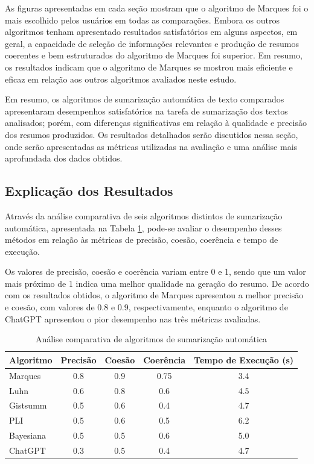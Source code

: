 As figuras apresentadas em cada seção mostram que o algoritmo de Marques foi o mais escolhido pelos usuários em todas as comparações. Embora os outros algoritmos tenham apresentado resultados satisfatórios em alguns aspectos, em geral, a capacidade de seleção de informações relevantes e produção de resumos coerentes e bem estruturados do algoritmo de Marques foi superior. Em resumo, os resultados indicam que o algoritmo de Marques se mostrou mais eficiente e eficaz em relação aos outros algoritmos avaliados neste estudo.

Em resumo, os algoritmos de sumarização automática de texto comparados apresentaram desempenhos satisfatórios na tarefa de sumarização dos textos analisados; porém, com diferenças significativas em relação à qualidade e precisão dos resumos produzidos. Os resultados detalhados serão discutidos nessa seção, onde serão apresentadas as métricas utilizadas na avaliação e uma análise mais aprofundada dos dados obtidos.

\subsection{Explicação dos Resultados}
\label{chap:explicacao}
Através da análise comparativa de seis algoritmos distintos de sumarização automática, apresentada 
na Tabela \ref{tab:algoritmos}, pode-se avaliar o desempenho desses métodos em relação às métricas de precisão, coesão, coerência e tempo de execução.

Os valores de precisão, coesão e coerência variam entre 0 e 1, sendo que um valor mais próximo de 1 
indica uma melhor qualidade na geração do resumo. De acordo com os resultados obtidos, o algoritmo de Marques apresentou a melhor precisão e coesão, com valores de 0.8 e 0.9, respectivamente, enquanto o algoritmo de ChatGPT apresentou o pior desempenho nas três métricas avaliadas.

\begin{table}[h]
    \centering
      \caption{Análise comparativa de algoritmos de sumarização automática}
    \label{tab:algoritmos}
    \begin{tabular}{@{}lcccc@{}}
        \toprule
        Algoritmo   & Precisão & Coesão & Coerência & Tempo de Execução (s) \\
        \midrule
        Marques     & 0.8      & 0.9    & 0.75      & 3.4                   \\
        Luhn        & 0.6      & 0.8    & 0.6       & 4.5                   \\
        Gistsumm    & 0.5      & 0.6    & 0.4       & 4.7                   \\
        PLI         & 0.5      & 0.6    & 0.5       & 6.2                   \\
        Bayesiana   & 0.5      & 0.5    & 0.6       & 5.0                   \\
        ChatGPT     & 0.3      & 0.5    & 0.4       & 4.7                   \\
        \bottomrule
    \end{tabular}
\end{table}

